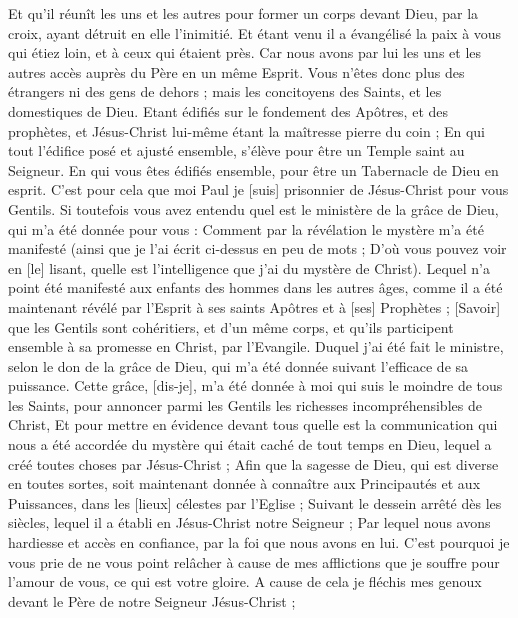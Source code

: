 \begin{multicols}{2}
Et qu'il réunît les uns et les autres pour former un corps devant Dieu, par la croix, ayant détruit en elle l'inimitié.
Et étant venu il a évangélisé la paix à vous qui étiez loin, et à ceux qui étaient près.
Car nous avons par lui les uns et les autres accès auprès du Père en un même Esprit.
Vous n'êtes donc plus des étrangers ni des gens de dehors ; mais les concitoyens des Saints, et les domestiques de Dieu.
Etant édifiés sur le fondement des Apôtres, et des prophètes, et Jésus-Christ lui-même étant la maîtresse pierre du coin ;
En qui tout l'édifice posé et ajusté ensemble, s'élève pour être un Temple saint au Seigneur.
En qui vous êtes édifiés ensemble, pour être un Tabernacle de Dieu en esprit.
\VerseOne{}C’est pour cela que moi Paul je [suis] prisonnier de Jésus-Christ pour vous Gentils.
Si toutefois vous avez entendu quel est le ministère de la grâce de Dieu, qui m'a été donnée pour vous :
Comment par la révélation le mystère m'a été manifesté (ainsi que je l'ai écrit ci-dessus en peu de mots ;
D'où vous pouvez voir en [le] lisant, quelle est l'intelligence que j'ai du mystère de Christ).
Lequel n'a point été manifesté aux enfants des hommes dans les autres âges, comme il a été maintenant révélé par l'Esprit à ses saints Apôtres et à [ses] Prophètes ;
[Savoir] que les Gentils sont cohéritiers, et d'un même corps, et qu'ils participent ensemble à sa promesse en Christ, par l'Evangile.
Duquel j'ai été fait le ministre, selon le don de la grâce de Dieu, qui m'a été donnée suivant l'efficace de sa puissance.
Cette grâce, [dis-je], m'a été donnée à moi qui suis le moindre de tous les Saints, pour annoncer parmi les Gentils les richesses incompréhensibles de Christ,
Et pour mettre en évidence devant tous quelle est la communication qui nous a été accordée du mystère qui était caché de tout temps en Dieu, lequel a créé toutes choses par Jésus-Christ ;
Afin que la sagesse de Dieu, qui est diverse en toutes sortes, soit maintenant donnée à connaître aux Principautés et aux Puissances, dans les [lieux] célestes par l’Eglise ;
Suivant le dessein arrêté dès les siècles, lequel il a établi en Jésus-Christ notre Seigneur ;
Par lequel nous avons hardiesse et accès en confiance, par la foi que nous avons en lui.
C'est pourquoi je vous prie de ne vous point relâcher à cause de mes afflictions que je souffre pour l'amour de vous, ce qui est votre gloire.
A cause de cela je fléchis mes genoux devant le Père de notre Seigneur Jésus-Christ ;

\end{multicols}
